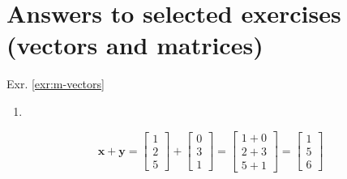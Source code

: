 \documentclass[
]{book}
\providecommand{\tightlist}{%
  \setlength{\itemsep}{0pt}\setlength{\parskip}{0pt}}
\theoremstyle{definition}
\theoremstyle{definition}
\theoremstyle{definition}
\theoremstyle{remark}
\begin{document}
\hypertarget{answers-to-selected-exercises-vectors-and-matrices}{%
\section*{Answers to selected exercises (vectors and matrices)}\label{answers-to-selected-exercises-vectors-and-matrices}}

Exr. \ref{exr:m-vectors}

\begin{enumerate}
\def\labelenumi{\alph{enumi})}
\tightlist
\item
\end{enumerate}

\[\mathbf{x} + \mathbf{y} = \begin{bmatrix} 1 \\ 2 \\ 5 \end{bmatrix} + \begin{bmatrix} 0 \\ 3 \\ 1 \end{bmatrix} = \begin{bmatrix} 1 + 0\\ 2 + 3 \\ 5 + 1 \end{bmatrix} = \begin{bmatrix} 1 \\ 5 \\ 6 \end{bmatrix}\]
\end{document}
